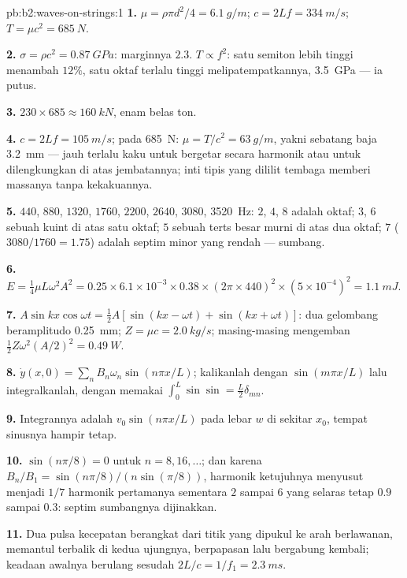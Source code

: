 \begin{solution}{pb:b2:waves-on-strings:1}
\textbf{1.} $\mu = \rho\pi d^2/4 = \qty{6.1}{g/m}$; $c = 2Lf = \qty{334}{m/s}$; $T = \mu c^2
= \qty{685}{N}$.

\textbf{2.} $\sigma = \rho c^2 = \qty{0.87}{GPa}$: marginnya $2.3$. $T \propto f^2$: satu
semiton lebih tinggi menambah $12\%$, satu oktaf terlalu tinggi melipatempatkannya,
\qty{3.5}{GPa} --- ia putus.

\textbf{3.} $230 \times 685 \approx \qty{160}{kN}$, enam belas ton.

\textbf{4.} $c = 2Lf = \qty{105}{m/s}$; pada \qty{685}{N}: $\mu = T/c^2 = \qty{63}{g/m}$,
yakni sebatang baja \qty{3.2}{mm} --- jauh terlalu kaku untuk bergetar
secara harmonik atau untuk dilengkungkan di atas jembatannya; inti tipis yang dililit tembaga
memberi massanya tanpa kekakuannya.

\textbf{5.} $440$, $880$, $1320$, $1760$, $2200$, $2640$, $3080$, \qty{3520}{Hz}: $2$,
$4$, $8$ adalah oktaf; $3$, $6$ sebuah kuint di atas satu oktaf; $5$ sebuah terts
besar murni di atas dua oktaf; $7$ ($3080/1760 = 1.75$) adalah septim
minor yang rendah --- sumbang.

\textbf{6.} $E = \tfrac14\mu L\omega^2A^2 = 0.25 \times 6.1 \times 10^{-3} \times 0.38 \times (2\pi
\times 440)^2 \times (5 \times 10^{-4})^2 = \qty{1.1}{mJ}$.

\textbf{7.} $A\sin kx\cos\omega t = \tfrac12A[\sin(kx - \omega t) + \sin(kx + \omega t)]$: dua
gelombang beramplitudo \qty{0.25}{mm}; $Z = \mu c = \qty{2.0}{kg/s}$; masing-masing mengemban
$\tfrac12Z\omega^2(A/2)^2 = \qty{0.49}{W}$.

\textbf{8.} $\dot y(x, 0) = \sum_nB_n\omega_n\sin(n\pi x/L)$; kalikanlah dengan
$\sin(m\pi x/L)$ lalu integralkanlah, dengan memakai $\int_0^L\sin\sin = \tfrac L2\delta_{mn}$.

\textbf{9.} Integrannya adalah $v_0\sin(n\pi x/L)$ pada lebar $w$ di sekitar $x_0$,
tempat sinusnya hampir tetap.

\textbf{10.} $\sin(n\pi/8) = 0$ untuk $n = 8, 16, \dots$; dan karena $B_n/B_1 =
\sin(n\pi/8)/(n\sin(\pi/8))$, harmonik ketujuhnya menyusut menjadi $1/7$ harmonik
pertamanya sementara $2$ sampai $6$ yang selaras tetap $0.9$ sampai $0.3$: septim
sumbangnya dijinakkan.

\textbf{11.} Dua pulsa kecepatan berangkat dari titik yang dipukul ke arah
berlawanan, memantul terbalik di kedua ujungnya, berpapasan lalu bergabung kembali;
keadaan awalnya berulang sesudah $2L/c = 1/f_1 = \qty{2.3}{ms}$.


\end{solution}

